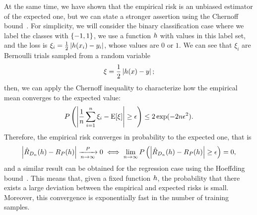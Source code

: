 At the same time, we have shown that the empirical risk is an unbiased estimator of the expected one, but we can state a stronger assertion using the Chernoff bound~\citep{Chernoff52}.
For simplicity, we will consider the binary classification case where we label the classes with $\left\{-1, 1\right\}$, we use a function $h$ with values in this label set, and the loss is $\xi_i = \frac{1}{2} \left|h(x_i) - y_i\right|$, whose values are $0$ or $1$. We can see that $\xi_i$ are Bernoulli trials sampled from a random variable 
$$ \xi = \frac{1}{2} \left|h(x) - y\right| ;$$
then, we can apply the Chernoff inequality to characterize how the empirical mean converges to the expected value:
\begin{equation}
    \nonumber
    P \left(\left|\frac{1}{n} \sum_{i=1}^n \xi_i - \operatorname{E}[\xi]\right| \geq \epsilon  \right) \leq 2 \exp(-2n \epsilon^2) .
\end{equation}
Therefore, the empirical risk converges in probability to the expected one, that is
\begin{equation}
    \label{eq:risk_chernoff}
    \abs{\empriskn(\hypf) -\exprisk(\hypf)} \xrightarrow[\nsamples \to \infty]{\distf} 0 \iff \lim_{n \to \infty} P\left(\abs{\empriskn(\hypf) -\exprisk(\hypf)} \geq \epsilon  \right) = 0,
\end{equation}
and a similar result can be obtained for the regression case using the Hoeffding bound~\citep{Hoeffding63}.
This means that, given a fixed function $h$, the probability that there exists a large deviation between the empirical and expected risks is small. Moreover, this convergence is exponentially fast in the number of training samples.

